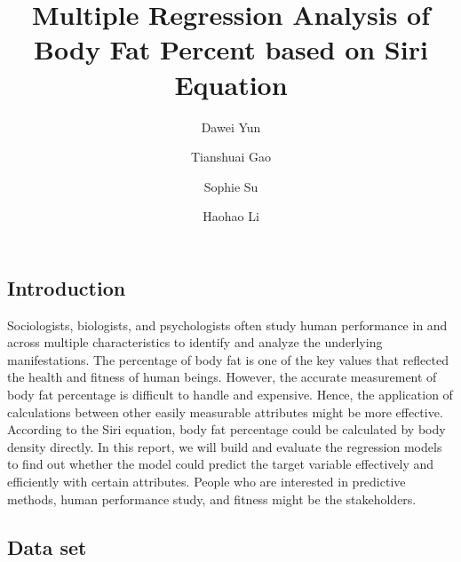 \documentclass[letterpaper,9pt,twocolumn,twoside,]{pinp}
\title{Multiple Regression Analysis of Body Fat Percent based on Siri
Equation}
\author[a]{Dawei Yun}
\author[a]{Tianshuai Gao}
\author[a]{Sophie Su}
\author[a]{Haohao Li}
\affil[a]{DATA2002 RE03E1 USYD}
\begin{document}
\verticaladjustment{-2pt}

\maketitle
\thispagestyle{firststyle}



\hypertarget{introduction}{%
\subsection{Introduction}\label{introduction}}

Sociologists, biologists, and psychologists often study human
performance in and across multiple characteristics to identify and
analyze the underlying manifestations. The percentage of body fat is one
of the key values that reflected the health and fitness of human beings.
However, the accurate measurement of body fat percentage is difficult to
handle and expensive. Hence, the application of calculations between
other easily measurable attributes might be more effective. According to
the Siri equation, body fat percentage could be calculated by body
density directly. In this report, we will build and evaluate the
regression models to find out whether the model could predict the target
variable effectively and efficiently with certain attributes. People who
are interested in predictive methods, human performance study, and
fitness might be the stakeholders.

\hypertarget{data-set}{%
\subsection{Data set}\label{data-set}}
\end{document}
